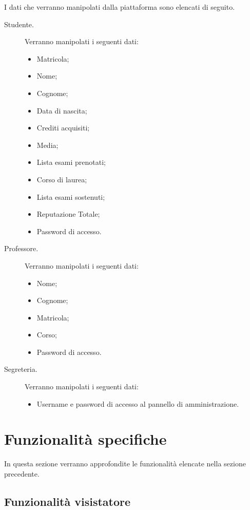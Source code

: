 \documentclass [a4paper,11pt]{book}
\begin{document}
I dati che verranno manipolati dalla piattaforma sono elencati di seguito.
\begin{description}
\item[Studente.] Verranno manipolati i seguenti dati:

\begin{itemize}
\item Matricola;
\item Nome;
\item Cognome;
\item Data di nascita;
\item Crediti acquisiti;
\item Media;
\item Lista esami prenotati; 
\item Corso di laurea;
\item Lista esami sostenuti;
\item Reputazione Totale;
\item Password di accesso.
\end{itemize}

\item[Professore.] Verranno manipolati i seguenti dati:

\begin{itemize}
\item Nome;
\item Cognome;
\item Matricola;
\item Corso;
\item Password di accesso.
\end{itemize}

\item[Segreteria.] Verranno manipolati i seguenti dati:
\begin{itemize}
\item Username e password di accesso al pannello di amministrazione.
\end{itemize}
\end{description}

\medskip
\medskip

\section{Funzionalità specifiche}

In questa sezione verranno approfondite le funzionalità elencate nella sezione precedente.

\subsection{Funzionalità visistatore}
\end{document}

